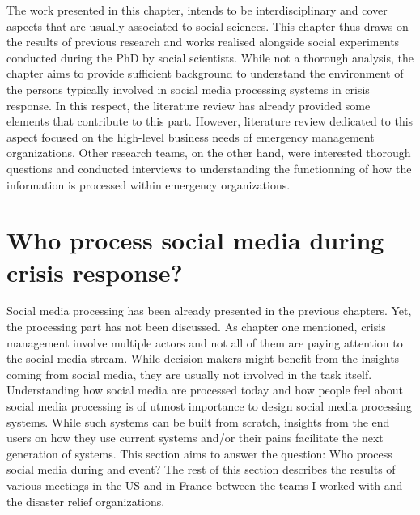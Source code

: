 The work presented in this chapter, intends to be interdisciplinary and cover aspects that are usually associated to social sciences.
This chapter thus draws on the results of previous research and works realised alongside social experiments conducted during the PhD by social scientists.
While not a thorough analysis, the chapter aims to provide sufficient background to understand the environment of the persons typically involved in social media processing systems in crisis response.
In this respect, the literature review has already provided some elements that contribute to this part.
However, literature review dedicated to this aspect focused on the high-level business needs of emergency management organizations.
Other research teams, on the other hand, were interested thorough questions and conducted
interviews to understanding the functionning of how the information is processed within emergency organizations.

\section{Who process social media during crisis response?}
Social media processing has been already presented in the previous chapters.
Yet, the processing part has not been discussed.
As chapter one mentioned, crisis management involve multiple actors and not all of them are paying attention to the social media stream.
While decision makers might benefit from the insights coming from social media, they are usually not involved in the task itself.
Understanding how social media are processed today and how people feel about social media processing is of utmost importance to design social media processing systems.
While such systems can be built from scratch, insights from the end users on how they use current systems and/or their pains facilitate the next generation of systems.
This section aims to answer the question: Who process social media during and event?
The rest of this section describes the results of various meetings in the US and in France between the teams I worked with and the disaster relief organizations.

